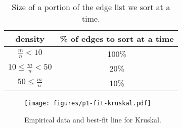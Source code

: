 \begin{table}
\begin{tabular}{|c|c|}
\hline
density&\% of edges to sort at a time\\
\hline
$\frac{m}{n} < 10$& 100\% \\
$10 \leq \frac{m}{n} < 50$& 20\% \\
$50 \leq \frac{m}{n}$& 10\% \\
\hline
\end{tabular}
\caption{Size of a portion of the edge list we sort at a time.}
\label{table:kruskal-sort-percent}
\end{table}

\begin{figure}[htb]
\centering
\texttt{[image: figures/p1-fit-kruskal.pdf]}
\caption{Empirical data and best-fit line for Kruskal.}
\label{fig:p1-fit-kruskal}
\end{figure}
